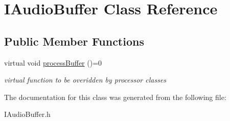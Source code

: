 \hypertarget{classIAudioBuffer}{}\section{I\+Audio\+Buffer Class Reference}
\label{classIAudioBuffer}
\subsection*{Public Member Functions}
\begin{DoxyCompactItemize}
\item 
\mbox{\label{classIAudioBuffer_ae097a859bff6d7bdc5c2255075724d5e}} 
virtual void \hyperlink{classIAudioBuffer_ae097a859bff6d7bdc5c2255075724d5e}{process\+Buffer} ()=0
\begin{DoxyCompactList}\small\item\em virtual function to be overidden by processor classes \end{DoxyCompactList}\end{DoxyCompactItemize}


The documentation for this class was generated from the following file\+:\begin{DoxyCompactItemize}
\item 
I\+Audio\+Buffer.\+h\end{DoxyCompactItemize}
